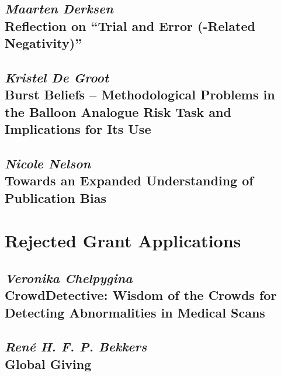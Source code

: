 \documentclass{book}
\begin{document}

\newpage\setcounter{page}{39}
\chapter{\textit{Maarten Derksen}\\ Reflection on “Trial and Error (-Related Negativity)”}
 {}

 {}


\newpage\setcounter{page}{42}
\chapter{\textit{Kristel De Groot}\\ Burst Beliefs – Methodological Problems in the Balloon Analogue Risk Task and Implications for Its Use}



\newpage\setcounter{page}{52}
\chapter{\textit{Nicole Nelson}\\ Towards an Expanded Understanding of Publication Bias}





\part{Rejected Grant Applications}

\newpage\setcounter{page}{59}
\chapter{\textit{Veronika Chelpygina}\\ CrowdDetective: Wisdom of the Crowds for Detecting Abnormalities in Medical Scans}

\newpage\setcounter{page}{72}

\chapter{\textit{Ren{\'e} H. F. P. Bekkers}\\ Global Giving}
\end{document}
